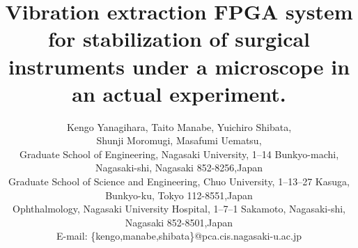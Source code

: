 \documentclass[conference]{style/IEEEtran}
\begin{document}
\title{Vibration extraction FPGA system for stabilization of surgical instruments under a microscope in an actual experiment.}



\author{
  Kengo Yanagihara,
  Taito Manabe, 
  Yuichiro Shibata,\\
  Shunji Moromugi, 
  Masafumi Uematsu,
  \\
  Graduate School of Engineering, Nagasaki University, 1--14 Bunkyo-machi, Nagasaki-shi, Nagasaki 852-8256,Japan\\
  Graduate School of Science and Engineering, Chuo University, 1--13--27 Kasuga, Bunkyo-ku, Tokyo 112-8551,Japan\\
  Ophthalmology, Nagasaki University Hospital, 1--7--1 Sakamoto, Nagasaki-shi, Nagasaki 852-8501,Japan\\
  E-mail: \{kengo,manabe,shibata\}@pca.cis.nagasaki-u.ac.jp
}


\maketitle
\end{document}
